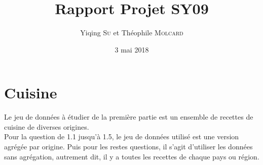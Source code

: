 \documentclass[a4paper, titlepage]{report}
\title{Rapport Projet SY09}
\date{3 mai 2018}
\author{Yiqing \textsc{Su} et Théophile \textsc{Molcard}}
\begin{document}
\renewcommand{\chaptername}{Partie}


\maketitle

\tableofcontents



\chapter{Cuisine}

Le jeu de données à étudier de la première partie est un ensemble de recettes de cuisine de diverses origines.\\
\indent Pour la question de 1.1 jusqu'à 1.5, le jeu de données utilisé est une version agrégée par origine. Puis pour les restes questions, il s'agit d'utiliser les données sans agrégation, autrement dit, il y a toutes les recettes de chaque pays ou région.
\end{document}
